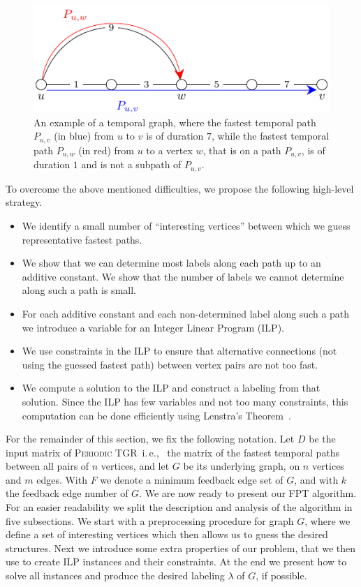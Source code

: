 \documentclass[a4paper,UKenglish,cleveref, autoref, thm-restate]{lipics-v2021}
\newcommand{\ie}{i.\,e.,\ }
\newcommand{\deltaExact}{\textsc{Periodic TGR}}
\begin{document}
	\begin{figure}[t]
    \centering
	\includegraphics{fig-motivationExample}
	\caption{An example of a temporal graph, where the fastest temporal path $P_{u,v}$ (in blue) from $u$ to $v$ is of duration $7$,
		while the fastest temporal path $P_{u,w}$ (in red) from $u$ to a vertex $w$, that is on a path $P_{u,v}$, is of duration $1$ and is not a subpath of $P_{u,v}$.		
		\label{fig:ftpExample}}
	\end{figure}

To overcome the above mentioned difficulties, we propose the following high-level strategy.
\begin{itemize}
    \item We identify a small number of ``interesting vertices'' between which we guess representative fastest paths.
    \item We show that we can determine most labels along each path up to an additive constant. We show that the number of labels we cannot determine along such a path is small. 
    \item For each additive constant and each non-determined label along such a path we introduce a variable for an Integer Linear Program (ILP). 
    \item We use constraints in the ILP to ensure that alternative connections (not using the guessed fastest path) between vertex pairs are not too fast.
    \item We compute a solution to the ILP and construct a labeling from that solution. Since the ILP has few variables and not too many constraints, this computation can be done efficiently using Lenstra's Theorem~\cite{Lenstra1983Integer}.
\end{itemize}


For the remainder of this section, we fix the following notation. 
Let $D$ be the input matrix of \deltaExact\ \ie
the matrix of the fastest temporal paths between all pairs of $n$ vertices, and let $G$ be its underlying graph, on $n$ vertices and $m$ edges.
With $F$ we denote a minimum feedback edge set of $G$, and with $k$ the feedback edge number of $G$.
We are now ready to present our FPT algorithm. For an easier readability we split the description and analysis of the algorithm in five subsections.
We start with a preprocessing procedure for graph $G$, where we define a set of interesting vertices which then allows us to guess the desired structures.
Next we introduce some extra properties of our problem, that we then use to create ILP instances and their constraints.
At the end we present how to solve all instances and produce the desired labeling $\lambda$ of $G$, if possible.
\end{document}
